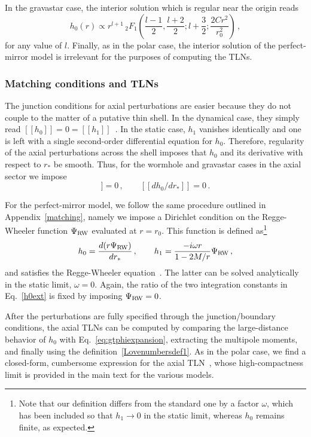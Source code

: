 \documentclass[aps,twocolumn,showpacs,preprintnumbers,nofootinbib,prd,superscriptaddress,groupedaddress,10pt]{revtex4-1}
\def\be{\begin{equation}}
\def\ee{\end{equation}}
\begin{document}
In the gravastar case, the interior solution which is regular near the origin reads
%
\be\label{h0intGS}
h_0(r) \propto r^{l+1} \, _2F_1\left(\frac{l-1}{2},\frac{l+2}{2};l+\frac{3}{2};\frac{2 C r^2}{r_0^2}\right)\,,
\ee%
%
for any value of $l$. Finally, as in the polar case, the interior solution of the perfect-mirror model is irrelevant for the purposes of computing the TLNs.

\subsubsection{Matching conditions and TLNs}
The junction conditions for axial perturbations are easier because they do not couple to the matter of a putative thin shell. In the dynamical case, they simply read $[[h_0]]=0=[[h_1]]$~\cite{Pani:2009ss}. In the static case, $h_1$ vanishes identically and one is left with a single second-order differential equation for $h_0$. Therefore, regularity of the axial perturbations across the shell imposes that $h_0$ and its derivative with respect to $r_*$ be smooth. Thus, for the wormhole and gravastar cases in the axial sector we impose
\begin{equation}
 [[h_0]]=0\,, \qquad [[d h_0/dr_*]]=0\,. \label{junctionAxial}
\end{equation}

For the perfect-mirror model, we follow the same procedure outlined in Appendix~\ref{matching}, namely we impose a Dirichlet condition on the Regge-Wheeler function $\Psi_{\rm RW}$ evaluated at $r=r_0$. This function is defined as\footnote{Note that our definition differs from the standard one by a factor $\omega$, which has been included so that $h_1\to0$ in the static limit, whereas $h_0$ remains finite, as expected.}
%
\begin{eqnarray}
h_0=\frac{d(r\Psi_{\rm RW})}{dr_*}\,,\qquad h_1=\frac{-i\omega r }{1-2M/r}\Psi_{\rm RW}\,, \label{defh0}
\end{eqnarray}
%
and satisfies the Regge-Wheeler equation~\cite{Regge:1957td}. The latter can be solved analytically in the static limit, $\omega=0$. Again, the ratio of the two integration constants in Eq.~\eqref{h0ext} is fixed by imposing $\Psi_{\rm RW}=0$. 

After the perturbations are fully specified through the junction/boundary conditions, the axial TLNs can be computed by comparing the large-distance behavior of $h_0$ with Eq.~\eqref{eq:gtphiexpansion}, extracting the multipole moments, and finally using the definition~\eqref{Lovenumbersdef1}.
%
As in the polar case, we find a closed-form, cumbersome expression for the axial TLN~\cite{webpage}, whose high-compactness limit is provided in the main text for the various models.



	
\end{document}
